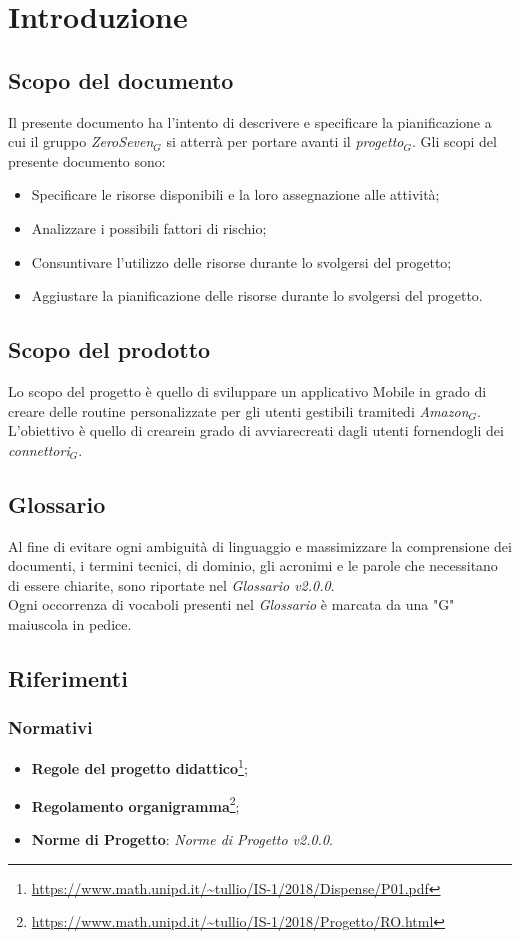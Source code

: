 \chapter{Introduzione}\label{Introduzione}
\section{Scopo del documento}
Il presente documento ha l'intento di descrivere e specificare la pianificazione a cui il gruppo \textit{ZeroSeven$_{G}$} si atterrà per portare avanti il \textit{progetto$_{G}$}.
Gli scopi del presente documento sono:
\begin{itemize}
	\item Specificare le risorse disponibili e la loro assegnazione alle attività;
	\item Analizzare i possibili fattori di rischio;
	\item Consuntivare l'utilizzo delle risorse durante lo svolgersi del progetto;
	\item Aggiustare la pianificazione delle risorse durante lo svolgersi del progetto.
\end{itemize}
\section{Scopo del prodotto}
Lo scopo del progetto è quello di sviluppare un applicativo Mobile in grado di creare delle routine personalizzate per gli utenti gestibili tramitedi \textit{Amazon$_{G}$}. L'obiettivo è quello di crearein grado di avviarecreati dagli utenti fornendogli dei \textit{connettori$_{G}$}.
\section{Glossario}
Al fine di evitare ogni ambiguità di linguaggio e massimizzare la comprensione dei documenti, i termini tecnici, di dominio, gli acronimi e le parole che necessitano di essere chiarite, sono riportate nel \textit{Glossario v2.0.0}.\\
Ogni occorrenza di vocaboli presenti nel \textit{Glossario} è marcata da una "G" maiuscola in pedice.
\section{Riferimenti}
\subsection{Normativi}
\label{normativi}
\begin{itemize}
	\item \textbf{Regole del progetto didattico}\footnote{\url{https://www.math.unipd.it/~tullio/IS-1/2018/Dispense/P01.pdf}};
	\item  \textbf{Regolamento organigramma}\footnote{\url{https://www.math.unipd.it/~tullio/IS-1/2018/Progetto/RO.html}};
	\item  \textbf{Norme di Progetto}: \textit{Norme di Progetto v2.0.0}.
\end{itemize}
